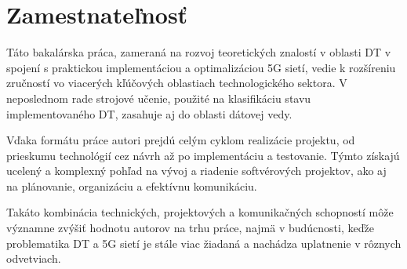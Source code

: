 \section{Zamestnateľnosť}
Táto bakalárska práca, zameraná na rozvoj teoretických znalostí v oblasti DT v spojení s praktickou implementáciou a optimalizáciou 5G sietí, vedie k rozšíreniu zručností vo viacerých kľúčových oblastiach technologického sektora. V neposlednom rade strojové učenie, použité na klasifikáciu stavu implementovaného DT, zasahuje aj do oblasti dátovej vedy.

Vďaka formátu práce autori prejdú celým cyklom realizácie projektu, od prieskumu technológií cez návrh až po implementáciu a testovanie. Týmto získajú ucelený a komplexný pohľad na vývoj a riadenie softvérových projektov, ako aj na plánovanie, organizáciu a efektívnu komunikáciu.

Takáto kombinácia technických, projektových a komunikačných schopností môže významne zvýšiť hodnotu autorov na trhu práce, najmä v budúcnosti, keďže problematika DT a 5G sietí je stále viac žiadaná a nachádza uplatnenie v rôznych odvetviach.